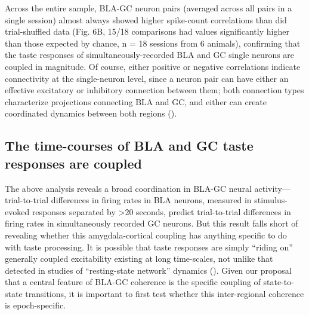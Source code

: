 \begin{refsection}
Across the entire sample, BLA-GC neuron pairs (averaged across all pairs in a single session) almost always showed higher spike-count correlations than did trial-shuffled data (Fig. 6B, 15/18 comparisons had values significantly higher than those expected by chance, n = 18 sessions from 6 animals), confirming that the taste responses of simultaneously-recorded BLA and GC single neurons are coupled in magnitude. Of course, either positive or negative correlations indicate connectivity at the single-neuron level, since a neuron pair can have either an effective excitatory or inhibitory connection between them; both connection types characterize projections connecting BLA and GC, and either can create coordinated dynamics between both regions (\cite{haley2016a,fu2020a}).

\subsection{The time-courses of BLA and GC taste responses are coupled}
The above analysis reveals a broad coordination in BLA-GC neural activity—trial-to-trial differences in firing rates in BLA neurons, measured in stimulus-evoked responses separated by >20 seconds, predict trial-to-trial differences in firing rates in simultaneously recorded GC neurons. But this result falls short of revealing whether this amygdala-cortical coupling has anything specific to do with taste processing. It is possible that taste responses are simply “riding on” generally coupled excitability existing at long time-scales, not unlike that detected in studies of “resting-state network” dynamics (\cite{raichle2015a,seitzman2019a}). Given our proposal that a central feature of BLA-GC coherence is the specific coupling of state-to-state transitions, it is important to first test whether this inter-regional coherence is epoch-specific.


\end{refsection}
